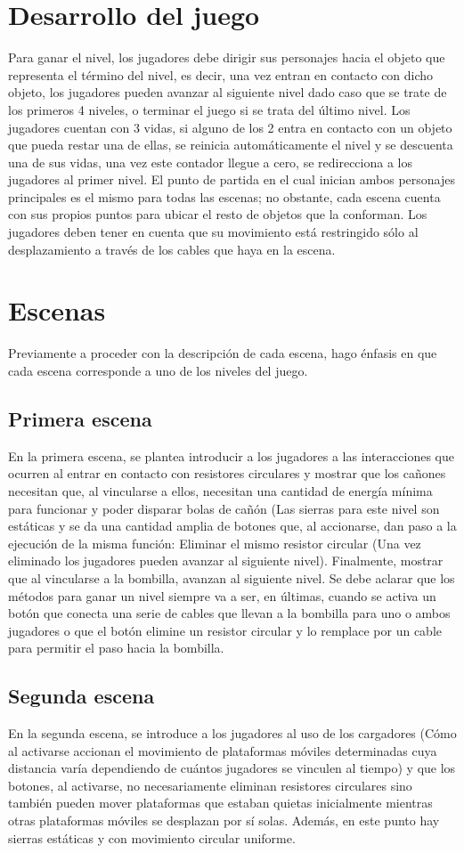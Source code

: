 \documentclass{article}
\begin{document}
\section{Desarrollo del juego}
Para ganar el nivel, los jugadores debe dirigir sus personajes hacia el objeto que representa el término del nivel, es decir, una vez entran en contacto con dicho objeto, los jugadores pueden avanzar al siguiente nivel dado caso que se trate de los primeros 4 niveles, o terminar el juego si se trata del último nivel. Los jugadores cuentan con 3 vidas, si alguno de los 2 entra en contacto con un objeto que pueda restar una de ellas, se reinicia automáticamente el nivel y se descuenta una de sus vidas, una vez este contador llegue a cero, se redirecciona a los jugadores al primer nivel. El punto de partida en el cual inician ambos personajes principales es el mismo para todas las escenas; no obstante, cada escena cuenta con sus propios puntos para ubicar el resto de objetos que la conforman. Los jugadores deben tener en cuenta que su movimiento está restringido sólo al desplazamiento a través de los cables que haya en la escena.
\section{Escenas}
Previamente a proceder con la descripción de cada escena, hago énfasis en que cada escena corresponde a uno de los niveles del juego.
\subsection{Primera escena}
En la primera escena, se plantea introducir a los jugadores a las interacciones que ocurren al entrar en contacto con resistores circulares y mostrar que los cañones necesitan que, al vincularse a ellos, necesitan una cantidad de energía mínima para funcionar y poder disparar bolas de cañón (Las sierras para este nivel son estáticas y se da una cantidad amplia de botones que, al accionarse, dan paso a la ejecución de la misma función: Eliminar el mismo resistor circular (Una vez eliminado los jugadores pueden avanzar al siguiente nivel). Finalmente, mostrar que al vincularse a la bombilla, avanzan al siguiente nivel. Se debe aclarar que los métodos para ganar un nivel siempre va a ser, en últimas, cuando se activa un botón que conecta una serie de cables que llevan a la bombilla para uno o ambos jugadores o que el botón elimine un resistor circular y lo remplace por un cable para permitir el paso hacia la bombilla.
\subsection{Segunda escena}
En la segunda escena, se introduce a los jugadores al uso de los cargadores (Cómo al activarse accionan el movimiento de plataformas móviles determinadas cuya distancia varía dependiendo de cuántos jugadores se vinculen al tiempo) y que los botones, al activarse, no necesariamente eliminan resistores circulares sino también pueden mover plataformas que estaban quietas inicialmente mientras otras plataformas móviles se desplazan por sí solas. Además, en este punto hay sierras estáticas y con movimiento circular uniforme.
\end{document}
